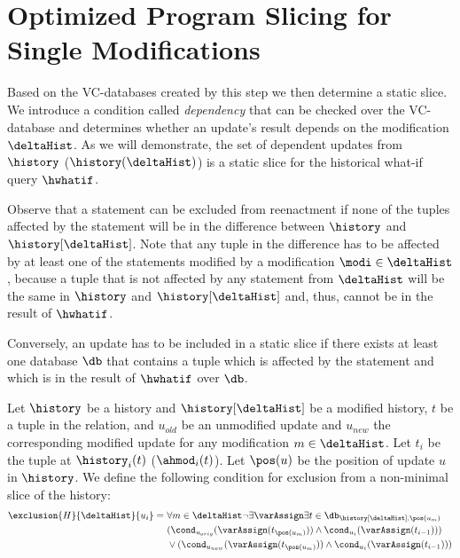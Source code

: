 \section{Optimized Program Slicing for Single Modifications}
\label{sec:optim-progr-slic}

Based on the VC-databases created by this step we then determine a static slice. We introduce a condition called \textit{dependency} that can be checked over the VC-database and determines whether an update's result depends on the modification $\deltaHist$. As we will demonstrate, the set of dependent updates from $\history$ ($\history(\deltaHist)$) is a static slice for the historical what-if query $\hwhatif$.

Observe that a statement can be excluded from reenactment if none of the tuples affected by the statement will be in the difference between $\history$ and $\history[\deltaHist]$. Note that any tuple in the difference has to be affected by at least one of the statements modified by a modification $\modi \in \deltaHist$, because a tuple that is not affected by any statement from $\deltaHist$ will be the same in $\history$ and $\history[\deltaHist]$ and, thus, cannot be in the result of $\hwhatif$.

Conversely, an update has to be included in a static slice if there exists at least one database $\db$ that contains a tuple which is affected by the statement and which is in the result of $\hwhatif$ over $\db$.

%
%
%

\begin{defi}
Let $\history$ be a history and $\history[\deltaHist]$ be a modified history, $t$ be a tuple in the relation, and $u_{old}$ be an unmodified update and $u_{new}$ the corresponding modified update for any modification $m \in \deltaHist$. Let $t_i$ be the tuple at $\history_i(t)$ ($\ahmod_i(t)$). Let $\pos(u)$ be the position of update $u$ in $\history$. We define the following condition for exclusion from a non-minimal slice of the history:
\begin{align*}
\exclusion{H}{\deltaHist}{u_i} =\ &\forall m \in \deltaHist \neg\exists \varAssign \exists t \in \db_{\history[\deltaHist], \pos(u_m)}\\
&(\cond_{u_{orig}}(\varAssign(t_{\pos({u_{m}})})) \land \cond_{u_{i}}(\varAssign(t_{i-1})))\\
&\lor (\cond_{u_{new}}(\varAssign(t_{\pos({u_{m}})})) \land \cond_{u_{i}}(\varAssign(t_{i-1})))
\end{align*}
\end{defi}

